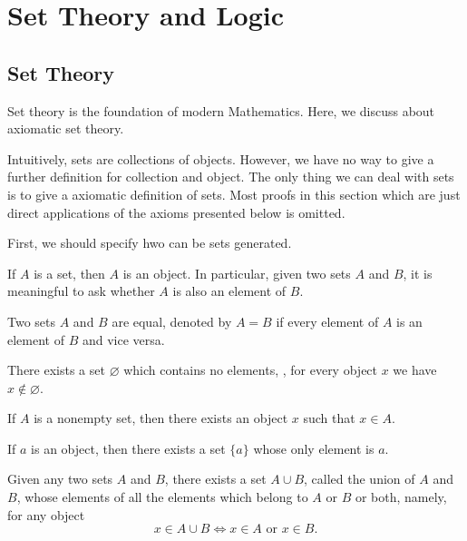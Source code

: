 \chapter{Set Theory and Logic}
\section{Set Theory}
Set theory is the foundation of modern Mathematics. 
Here, we discuss about axiomatic set theory. 

Intuitively, sets are collections of objects. 
However, we have no way to give a further definition for collection and 
object. 
The only thing we can deal with sets is to give a axiomatic definition of 
sets. 
Most proofs in this section which are just direct applications of the axioms 
presented below is omitted. 

First, we should specify hwo can be sets generated. 

\begin{axiom}
If $A$ is a set, then $A$ is an object. 
In particular, given two sets $A$ and $B$, it is meaningful to ask whether 
$A$ is also an element of $B$. 
\end{axiom}

\begin{axiom}
Two sets $A$ and $B$ are equal, denoted by $A = B$ if every element of $A$ 
is an element of $B$ and vice versa. 
\end{axiom}

\begin{axiom}
There exists a set $\varnothing$ which contains no elements, \ie, for every 
object $x$ we have $x \notin \varnothing$. 
\end{axiom}

\begin{lemma}
If $A$ is a nonempty set, then there exists an object $x$ such that $x \in 
A$. 
\end{lemma}

\begin{axiom}
If $a$ is an object, then there exists a set $\{a\}$ whose only element is 
$a$. 
\end{axiom}

\begin{axiom}
Given any two sets $A$ and $B$, there exists a set $A \cup B$, called the 
union of $A$ and $B$, whose elements of all the elements which belong to $A$ 
or $B$ or both, namely, for any object 
\begin{equation*}
    x \in A \cup B \iff x \in A \text{ or } x \in B.
\end{equation*}
\end{axiom}

